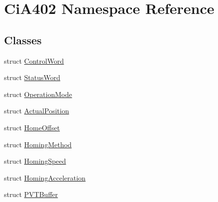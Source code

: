 \hypertarget{namespace_ci_a402}{\section{Ci\-A402 Namespace Reference}
\label{namespace_ci_a402}
}
\subsection*{Classes}
\begin{DoxyCompactItemize}
\item 
struct \hyperlink{struct_ci_a402_1_1_control_word}{Control\-Word}
\item 
struct \hyperlink{struct_ci_a402_1_1_status_word}{Status\-Word}
\item 
struct \hyperlink{struct_ci_a402_1_1_operation_mode}{Operation\-Mode}
\item 
struct \hyperlink{struct_ci_a402_1_1_actual_position}{Actual\-Position}
\item 
struct \hyperlink{struct_ci_a402_1_1_home_offset}{Home\-Offset}
\item 
struct \hyperlink{struct_ci_a402_1_1_homing_method}{Homing\-Method}
\item 
struct \hyperlink{struct_ci_a402_1_1_homing_speed}{Homing\-Speed}
\item 
struct \hyperlink{struct_ci_a402_1_1_homing_acceleration}{Homing\-Acceleration}
\item 
struct \hyperlink{struct_ci_a402_1_1_p_v_t_buffer}{P\-V\-T\-Buffer}
\end{DoxyCompactItemize}
